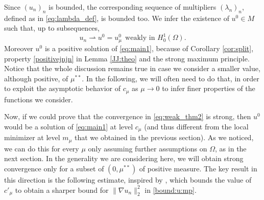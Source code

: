 \documentclass[10pt]{article}
\theoremstyle{definition}
\numberwithin{equation}{section}
\begin{document}
Since $(u_n)_n$ is bounded, the corresponding sequence of multipliers $(\lambda_n)_n$, defined
as in \eqref{eq:lambda_def}, is bounded too.
We infer the existence of $u^0\in M$ such that, up to subsequences,
\begin{equation}\label{eq:weak_thm2}
u_{n}\rightharpoonup u^{0} = u^{0}_\mu \ \ \text{weakly in } H^{1}_{0}(\Omega).
\end{equation}
Moreover $u^0$ is a positive solution of \eqref{eq:main1}, because of
Corollary \ref{cor:split}, property \ref{positivejnjn} in Lemma \ref{JJ:theo} and the strong maximum
principle. Notice that the whole discussion remains true in case we consider a smaller value, although
positive, of $\mu^{**}$. In the following, we will often need to do that, in order to exploit the
asymptotic behavior of $c_\mu$ as $\mu\to0$ to infer finer properties of the functions we consider.

Now, if we could prove that the convergence in \eqref{eq:weak_thm2} is strong, then $u^0$ would be a
solution of \eqref{eq:main1} at level $c_\mu$ (and thus different
from the local minimizer at level $m_\mu$ that we obtained in the previous section). As we noticed,
we can do this for every $\mu$ only assuming further assumptions on $\Omega$, as in the next section. 
In the generality we are considering here,
we will obtain strong convergence only for a subset of $(0,\mu^{**})$ of positive measure. The
key result in this direction is the following estimate, inspired by \cite[Lemma 2]{MR1245097}, which bounds the value of $c'_\mu$ to obtain
a sharper bound for $\|\nabla u_{n}\|_{2}^{2}$ in \eqref{bound:u:mp}.
\end{document}
